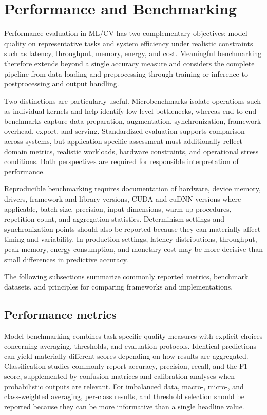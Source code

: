 \documentclass{article}
\begin{document}
\section{Performance and Benchmarking}

Performance evaluation in ML/CV has two complementary objectives: model quality on representative tasks and system efficiency under realistic constraints such as latency, throughput, memory, energy, and cost. Meaningful benchmarking therefore extends beyond a single accuracy measure and considers the complete pipeline from data loading and preprocessing through training or inference to postprocessing and output handling.

Two distinctions are particularly useful. Microbenchmarks isolate operations such as individual kernels and help identify low-level bottlenecks, whereas end-to-end benchmarks capture data preparation, augmentation, synchronization, framework overhead, export, and serving. Standardized evaluation supports comparison across systems, but application-specific assessment must additionally reflect domain metrics, realistic workloads, hardware constraints, and operational stress conditions. Both perspectives are required for responsible interpretation of performance.

Reproducible benchmarking requires documentation of hardware, device memory, drivers, framework and library versions, CUDA and cuDNN versions where applicable, batch size, precision, input dimensions, warm-up procedures, repetition count, and aggregation statistics. Determinism settings and synchronization points should also be reported because they can materially affect timing and variability. In production settings, latency distributions, throughput, peak memory, energy consumption, and monetary cost may be more decisive than small differences in predictive accuracy.

The following subsections summarize commonly reported metrics, benchmark datasets, and principles for comparing frameworks and implementations.


\subsection{Performance metrics}

Model benchmarking combines task-specific quality measures with explicit choices concerning averaging, thresholds, and evaluation protocols. Identical predictions can yield materially different scores depending on how results are aggregated. Classification studies commonly report accuracy, precision, recall, and the F1 score, supplemented by confusion matrices and calibration analyses when probabilistic outputs are relevant. For imbalanced data, macro-, micro-, and class-weighted averaging, per-class results, and threshold selection should be reported because they can be more informative than a single headline value.
\end{document}
